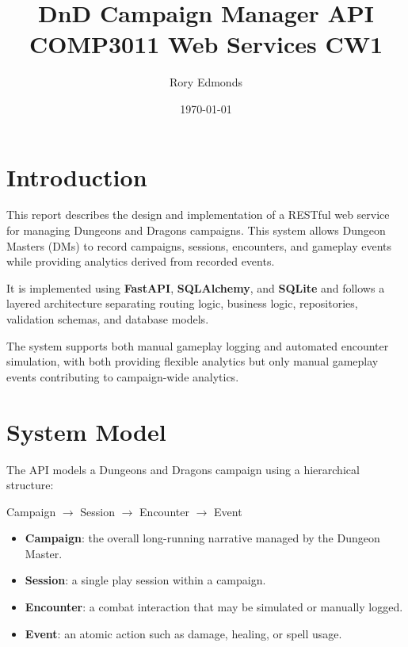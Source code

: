 \documentclass[11pt]{article}
\title{DnD Campaign Manager API\\
\large COMP3011 Web Services CW1}
\author{Rory Edmonds}
\date{\today}
\begin{document}
\maketitle

\tableofcontents
\newpage


\section{Introduction}

This report describes the design and implementation of a RESTful web service for managing Dungeons and Dragons campaigns. This system allows Dungeon Masters (DMs) to record campaigns, sessions, encounters, and gameplay events while providing analytics derived from recorded events.

It is implemented using \textbf{FastAPI}, \textbf{SQLAlchemy}, and \textbf{SQLite} and follows a layered architecture separating routing logic, business logic, repositories, validation schemas, and database models.

The system supports both manual gameplay logging and automated encounter simulation, with both providing flexible analytics but only manual gameplay events contributing to campaign-wide analytics.


\section{System Model}

The API models a Dungeons and Dragons campaign using a hierarchical
structure:

\begin{center}
Campaign $\rightarrow$ Session $\rightarrow$ Encounter $\rightarrow$ Event
\end{center}

\begin{itemize}
\item \textbf{Campaign}: the overall long-running narrative managed by the Dungeon Master.
\item \textbf{Session}: a single play session within a campaign.
\item \textbf{Encounter}: a combat interaction that may be simulated or manually logged.
\item \textbf{Event}: an atomic action such as damage, healing, or spell usage.
\end{itemize}
\end{document}
